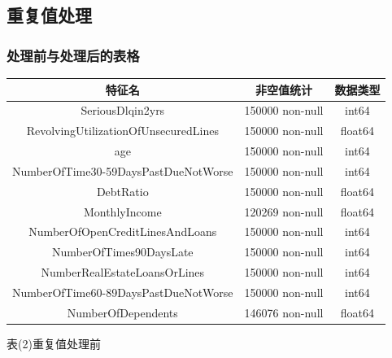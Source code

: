 \documentclass[12pt]{article}
\begin{document}
\newpage



\subsection{重复值处理}
\subsubsection{处理前与处理后的表格}
\begin{tabular}{|c|c|c|}
	\hline 
	特征名  & 非空值统计  & 数据类型 \\ 
	\hline 
	SeriousDlqin2yrs & 150000 non-null & int64  \\ 
	\hline 
	RevolvingUtilizationOfUnsecuredLines & 150000 non-null & float64 \\ 
	\hline 
	age & 150000 non-null & int64  \\ 
	\hline 
	NumberOfTime30-59DaysPastDueNotWorse & 150000 non-null & int64  \\ 
	\hline 
	DebtRatio   & 150000 non-null & float64 \\ 
	\hline 
	MonthlyIncome & 120269 non-null & float64 \\ 
	\hline 
	NumberOfOpenCreditLinesAndLoans & 150000 non-null & int64 \\ 
	\hline 
	NumberOfTimes90DaysLate  & 150000 non-null & int64 \\ 
	\hline 
	NumberRealEstateLoansOrLines  & 150000 non-null & int64 \\ 
	\hline 
	NumberOfTime60-89DaysPastDueNotWorse & 150000 non-null & int64 \\ 
	\hline 
	NumberOfDependents & 146076 non-null & float64 \\ 
	\hline 
\end{tabular} 
\begin{center}
	表(2)重复值处理前
\end{center}
\vspace{1cm}

\vspace{1cm}
\end{document}
